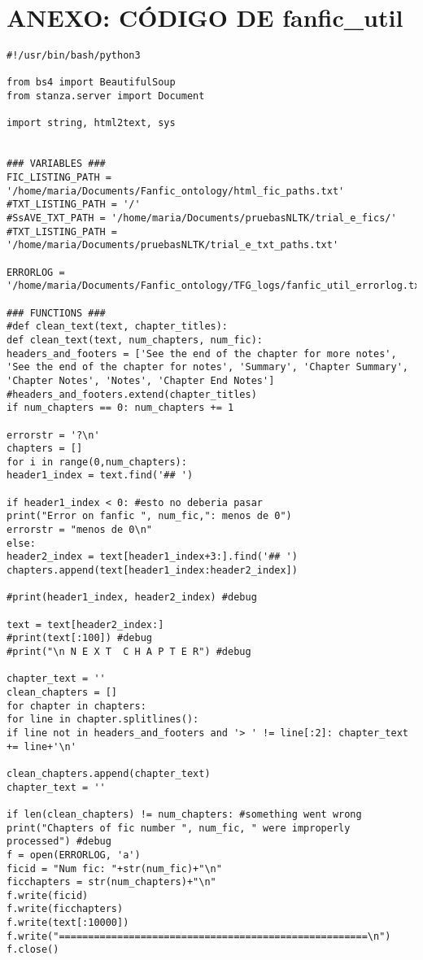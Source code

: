 \documentclass{pre-tfg}
\begin{document}
\section{ANEXO: CÓDIGO DE fanfic\_util}
\begin{lstlisting}[style=consola]
#!/usr/bin/bash/python3

from bs4 import BeautifulSoup
from stanza.server import Document

import string, html2text, sys


### VARIABLES ###
FIC_LISTING_PATH = '/home/maria/Documents/Fanfic_ontology/html_fic_paths.txt'
#TXT_LISTING_PATH = '/'
#SsAVE_TXT_PATH = '/home/maria/Documents/pruebasNLTK/trial_e_fics/'
#TXT_LISTING_PATH = '/home/maria/Documents/pruebasNLTK/trial_e_txt_paths.txt'

ERRORLOG = '/home/maria/Documents/Fanfic_ontology/TFG_logs/fanfic_util_errorlog.txt'

### FUNCTIONS ###
#def clean_text(text, chapter_titles):
def clean_text(text, num_chapters, num_fic):
headers_and_footers = ['See the end of the chapter for more notes', 'See the end of the chapter for notes', 'Summary', 'Chapter Summary', 'Chapter Notes', 'Notes', 'Chapter End Notes']
#headers_and_footers.extend(chapter_titles)
if num_chapters == 0: num_chapters += 1

errorstr = '?\n'
chapters = []
for i in range(0,num_chapters):
header1_index = text.find('## ')

if header1_index < 0: #esto no deberia pasar
print("Error on fanfic ", num_fic,": menos de 0")
errorstr = "menos de 0\n"
else:
header2_index = text[header1_index+3:].find('## ')
chapters.append(text[header1_index:header2_index])

#print(header1_index, header2_index) #debug

text = text[header2_index:]
#print(text[:100]) #debug
#print("\n N E X T  C H A P T E R") #debug

chapter_text = ''
clean_chapters = []
for chapter in chapters:
for line in chapter.splitlines():
if line not in headers_and_footers and '> ' != line[:2]: chapter_text += line+'\n'

clean_chapters.append(chapter_text)
chapter_text = ''

if len(clean_chapters) != num_chapters: #something went wrong
print("Chapters of fic number ", num_fic, " were improperly processed") #debug
f = open(ERRORLOG, 'a')
ficid = "Num fic: "+str(num_fic)+"\n"
ficchapters = str(num_chapters)+"\n" 
f.write(ficid)
f.write(ficchapters)
f.write(text[:10000])
f.write("=====================================================\n")
f.close()



\end{lstlisting}
\end{document}
